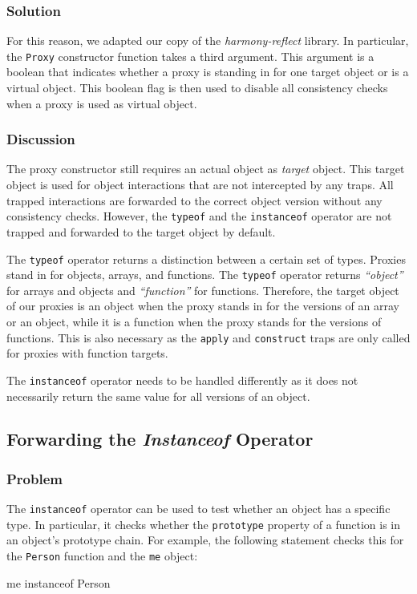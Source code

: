 \subsubsection{Solution}
For this reason, we adapted our copy of the \emph{harmony-reflect} library.
In particular, the \lstinline{Proxy} constructor function takes a third argument.
This argument is a boolean that indicates whether a proxy is standing in for one target object or is a virtual object.
This boolean flag is then used to disable all consistency checks when a proxy is used as virtual object.


\subsubsection{Discussion}

The proxy constructor still requires an actual object as \emph{target} object.
This target object is used for object interactions that are not intercepted by any traps.
All trapped interactions are forwarded to the correct object version without any consistency checks.
However, the \lstinline{typeof} and the \lstinline{instanceof} operator are not trapped and forwarded to the target object by default.

The \lstinline{typeof} operator returns a distinction between a certain set of types.
Proxies stand in for objects, arrays, and functions.
The \lstinline{typeof} operator returns \emph{``object''} for arrays and objects and \emph{``function''} for functions.
Therefore, the target object of our proxies is an object when the proxy stands in for the versions of an array or an object, while it is a function when the proxy stands for the versions of functions.
This is also necessary as the \lstinline{apply} and \lstinline{construct} traps are only called for proxies with function targets.

The \lstinline{instanceof} operator needs to be handled differently as it does not necessarily return the same value for all versions of an object.


\subsection{Forwarding the \emph{Instanceof} Operator}

\subsubsection{Problem}

The \lstinline{instanceof} operator can be used to test whether an object has a specific type.
In particular, it checks whether the \lstinline{prototype} property of a function is in an object's prototype chain.
For example, the following statement checks this for the \lstinline{Person} function and the \lstinline{me} object:

\begin{code}{}{}
me instanceof Person
\end{code}
\iffalse
\end{verbatim}\fi

